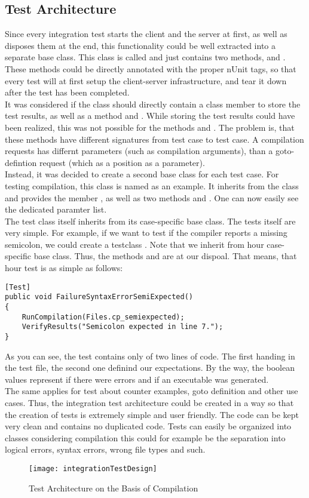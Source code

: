 \subsection{Test Architecture}
Since every integration test starts the client and the server at first, as well as disposes them at the end, this functionality could be well extracted into a separate base class. This class is called  and just contains two methods,  and . These methods could be directly annotated with the proper nUnit tags, so that every test will at first setup the client-server infrastructure, and tear it down after the test has been completed.\\
It was considered if the  class should directly contain a class member  to store the test results, as well as a method  and . While storing the test results could have been realized, this was not possible for the methods  and . The problem is, that these methods have different signatures from test case to test case. A compilation requests has differnt parameters (such as compilation arguments), than a goto-defintion request (which as a position as a parameter).\\
Instead, it was decided to create a second base class for each test case. For testing compilation, this class is named  as an example. It inherits from the  class and provides the member , as well as two methods  and . One can now easily see the dedicated paramter list.\\
The test class itself inherits from its case-specific base class. The tests itself are very simple. For example, if we want to test if the compiler reports a missing semicolon, we could create a testclass . Note that we inherit from hour case-specific base class. Thus, the methods  and are at our dispoal. That means, that hour test is as simple as follows:
\begin{lstlisting}[caption={Sample Test for Missing semicolon}, captionpos=b, label={lst:demoTest}]
[Test]
public void FailureSyntaxErrorSemiExpected()
{
    RunCompilation(Files.cp_semiexpected);
    VerifyResults("Semicolon expected in line 7.");
}
\end{lstlisting}
As you can see, the test contains only of two lines of code. The first handing in the test file, the second one definind our expectations. By the way, the boolean values represent if there were errors and if an executable was generated.\\
The same applies for test about counter examples, goto definition and other use cases. Thus, the integration test architecture could be created in a way so that the creation of tests is extremely simple and user friendly. The code can be kept very clean and contains no duplicated code. Tests can easily be organized into classes \textendash{} considering compilation this could for example be the separation into logical errors, syntax errors, wrong file types and such.

\begin{figure}[h]
    \centering
    \texttt{[image: integrationTestDesign]}
    \caption{Test Architecture on the Basis of Compilation}
    \label{fig:testArchitecture}
\end{figure}

